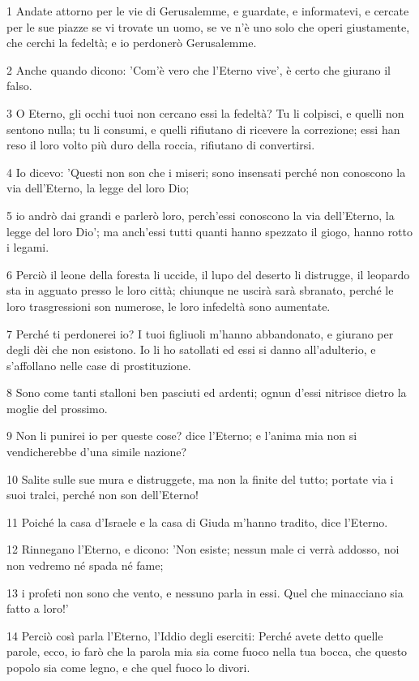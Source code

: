 \par 1 Andate attorno per le vie di Gerusalemme, e guardate, e informatevi, e cercate per le sue piazze se vi trovate un uomo, se ve n'è uno solo che operi giustamente, che cerchi la fedeltà; e io perdonerò Gerusalemme.
\par 2 Anche quando dicono: 'Com'è vero che l'Eterno vive', è certo che giurano il falso.
\par 3 O Eterno, gli occhi tuoi non cercano essi la fedeltà? Tu li colpisci, e quelli non sentono nulla; tu li consumi, e quelli rifiutano di ricevere la correzione; essi han reso il loro volto più duro della roccia, rifiutano di convertirsi.
\par 4 Io dicevo: 'Questi non son che i miseri; sono insensati perché non conoscono la via dell'Eterno, la legge del loro Dio;
\par 5 io andrò dai grandi e parlerò loro, perch'essi conoscono la via dell'Eterno, la legge del loro Dio'; ma anch'essi tutti quanti hanno spezzato il giogo, hanno rotto i legami.
\par 6 Perciò il leone della foresta li uccide, il lupo del deserto li distrugge, il leopardo sta in agguato presso le loro città; chiunque ne uscirà sarà sbranato, perché le loro trasgressioni son numerose, le loro infedeltà sono aumentate.
\par 7 Perché ti perdonerei io? I tuoi figliuoli m'hanno abbandonato, e giurano per degli dèi che non esistono. Io li ho satollati ed essi si danno all'adulterio, e s'affollano nelle case di prostituzione.
\par 8 Sono come tanti stalloni ben pasciuti ed ardenti; ognun d'essi nitrisce dietro la moglie del prossimo.
\par 9 Non li punirei io per queste cose? dice l'Eterno; e l'anima mia non si vendicherebbe d'una simile nazione?
\par 10 Salite sulle sue mura e distruggete, ma non la finite del tutto; portate via i suoi tralci, perché non son dell'Eterno!
\par 11 Poiché la casa d'Israele e la casa di Giuda m'hanno tradito, dice l'Eterno.
\par 12 Rinnegano l'Eterno, e dicono: 'Non esiste; nessun male ci verrà addosso, noi non vedremo né spada né fame;
\par 13 i profeti non sono che vento, e nessuno parla in essi. Quel che minacciano sia fatto a loro!'
\par 14 Perciò così parla l'Eterno, l'Iddio degli eserciti: Perché avete detto quelle parole, ecco, io farò che la parola mia sia come fuoco nella tua bocca, che questo popolo sia come legno, e che quel fuoco lo divori.
